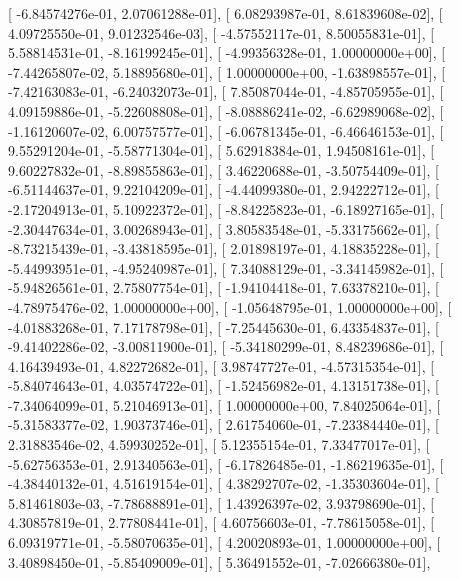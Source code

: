 \documentclass{article}
\begin{document}
       [ -6.84574276e-01,   2.07061288e-01],
       [  6.08293987e-01,   8.61839608e-02],
       [  4.09725550e-01,   9.01232546e-03],
       [ -4.57552117e-01,   8.50055831e-01],
       [  5.58814531e-01,  -8.16199245e-01],
       [ -4.99356328e-01,   1.00000000e+00],
       [ -7.44265807e-02,   5.18895680e-01],
       [  1.00000000e+00,  -1.63898557e-01],
       [ -7.42163083e-01,  -6.24032073e-01],
       [  7.85087044e-01,  -4.85705955e-01],
       [  4.09159886e-01,  -5.22608808e-01],
       [ -8.08886241e-02,  -6.62989068e-02],
       [ -1.16120607e-02,   6.00757577e-01],
       [ -6.06781345e-01,  -6.46646153e-01],
       [  9.55291204e-01,  -5.58771304e-01],
       [  5.62918384e-01,   1.94508161e-01],
       [  9.60227832e-01,  -8.89855863e-01],
       [  3.46220688e-01,  -3.50754409e-01],
       [ -6.51144637e-01,   9.22104209e-01],
       [ -4.44099380e-01,   2.94222712e-01],
       [ -2.17204913e-01,   5.10922372e-01],
       [ -8.84225823e-01,  -6.18927165e-01],
       [ -2.30447634e-01,   3.00268943e-01],
       [  3.80583548e-01,  -5.33175662e-01],
       [ -8.73215439e-01,  -3.43818595e-01],
       [  2.01898197e-01,   4.18835228e-01],
       [ -5.44993951e-01,  -4.95240987e-01],
       [  7.34088129e-01,  -3.34145982e-01],
       [ -5.94826561e-01,   2.75807754e-01],
       [ -1.94104418e-01,   7.63378210e-01],
       [ -4.78975476e-02,   1.00000000e+00],
       [ -1.05648795e-01,   1.00000000e+00],
       [ -4.01883268e-01,   7.17178798e-01],
       [ -7.25445630e-01,   6.43354837e-01],
       [ -9.41402286e-02,  -3.00811900e-01],
       [ -5.34180299e-01,   8.48239686e-01],
       [  4.16439493e-01,   4.82272682e-01],
       [  3.98747727e-01,  -4.57315354e-01],
       [ -5.84074643e-01,   4.03574722e-01],
       [ -1.52456982e-01,   4.13151738e-01],
       [ -7.34064099e-01,   5.21046913e-01],
       [  1.00000000e+00,   7.84025064e-01],
       [ -5.31583377e-02,   1.90373746e-01],
       [  2.61754060e-01,  -7.23384440e-01],
       [  2.31883546e-02,   4.59930252e-01],
       [  5.12355154e-01,   7.33477017e-01],
       [ -5.62756353e-01,   2.91340563e-01],
       [ -6.17826485e-01,  -1.86219635e-01],
       [ -4.38440132e-01,   4.51619154e-01],
       [  4.38292707e-02,  -1.35303604e-01],
       [  5.81461803e-03,  -7.78688891e-01],
       [  1.43926397e-02,   3.93798690e-01],
       [  4.30857819e-01,   2.77808441e-01],
       [  4.60756603e-01,  -7.78615058e-01],
       [  6.09319771e-01,  -5.58070635e-01],
       [  4.20020893e-01,   1.00000000e+00],
       [  3.40898450e-01,  -5.85409009e-01],
       [  5.36491552e-01,  -7.02666380e-01],
\end{document}
